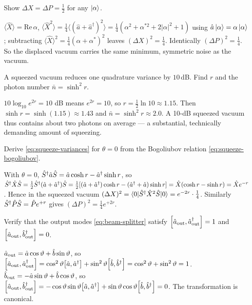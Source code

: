 \begin{exercise}
Show $\Delta X=\Delta P=\tfrac12$ for any $\ket\alpha$.
\begin{solution}
$\langle\hat X\rangle=\mathrm{Re}\,\alpha$,
$\langle\hat X^2\rangle=\tfrac14\langle(\hat a+\hat a^\dagger)^2\rangle
=\tfrac14(\alpha^2+\alpha^{*2}+2|\alpha|^2+1)$ using
$\hat a\ket\alpha=\alpha\ket\alpha$; subtracting
$\langle\hat X\rangle^2=\tfrac14(\alpha+\alpha^*)^2$ leaves
$(\Delta X)^2=\tfrac14$. Identically $(\Delta P)^2=\tfrac14$. So the
displaced vacuum carries the same minimum, symmetric noise as the
vacuum.
\end{solution}
\end{exercise}

\begin{exercise}
A squeezed vacuum reduces one quadrature variance by $10\,$dB.
Find $r$ and the photon number $\bar n=\sinh^2 r$.
\begin{solution}
$10\log_{10}e^{2r}=10$ dB means $e^{2r}=10$, so
$r=\tfrac12\ln10\approx1.15$. Then
$\sinh r=\sinh(1.15)\approx1.43$ and $\bar n=\sinh^2 r\approx2.0$.
A 10-dB squeezed vacuum thus contains about two photons on average
--- a substantial, technically demanding amount of squeezing.
\end{solution}
\end{exercise}

\begin{exercise}
Derive \cref{eq:squeeze-variances} for $\theta=0$ from the
Bogoliubov relation \cref{eq:squeeze-bogoliubov}.
\begin{solution}
With $\theta=0$, $\hat{S}^\dagger\hat a\hat{S}=\hat a\cosh r-\hat a^\dagger\sinh r$,
so $\hat{S}^\dagger\hat X\hat{S}=\tfrac12\hat{S}^\dagger(\hat a+\hat a^\dagger)\hat{S}
=\tfrac12[(\hat a+\hat a^\dagger)\cosh r-(\hat a^\dagger+\hat a)\sinh r]
=\hat X(\cosh r-\sinh r)=\hat X e^{-r}$. Hence in the squeezed vacuum
$(\Delta X)^2=\langle0|\hat{S}^\dagger\hat X^2\hat{S}|0\rangle=e^{-2r}\cdot\tfrac14$.
Similarly $\hat{S}^\dagger\hat P\hat{S}=\hat P e^{+r}$ gives
$(\Delta P)^2=\tfrac14 e^{+2r}$.
\end{solution}
\end{exercise}

\begin{exercise}
Verify that the output modes \cref{eq:beam-splitter} satisfy
$\comm{\hat a_{\rm out}}{\hat a_{\rm out}^\dagger}=1$ and
$\comm{\hat a_{\rm out}}{\hat b_{\rm out}^\dagger}=0$.
\begin{solution}
$\hat a_{\rm out}=\hat a\cos\vartheta+\hat b\sin\vartheta$, so
$\comm{\hat a_{\rm out}}{\hat a_{\rm out}^\dagger}
=\cos^2\vartheta\comm{\hat a}{\hat a^\dagger}+\sin^2\vartheta\comm{\hat b}{\hat b^\dagger}
=\cos^2\vartheta+\sin^2\vartheta=1$.
$\hat b_{\rm out}=-\hat a\sin\vartheta+\hat b\cos\vartheta$, so
$\comm{\hat a_{\rm out}}{\hat b_{\rm out}^\dagger}
=-\cos\vartheta\sin\vartheta\comm{\hat a}{\hat a^\dagger}+\sin\vartheta\cos\vartheta\comm{\hat b}{\hat b^\dagger}=0$.
The transformation is canonical.
\end{solution}
\end{exercise}

